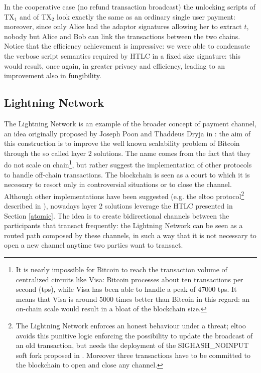 In the cooperative case (no refund transaction broadcast) the unlocking scripts of TX$_1$ and of TX$_2$ look exactly the same as an ordinary single user payment: moreover, since only Alice had the adaptor signatures allowing her to extract $t$, nobody but Alice and Bob can link the transactions between the two chains.
\\
Notice that the efficiency achievement is impressive: we were able to condensate the verbose script semantics required by HTLC in a fixed size signature: this would result, once again, in greater privacy and efficiency, leading to an improvement also in fungibility.

\bigskip

\subsection{Lightning Network}
\label{ln}
The Lightning Network is an example of the broader concept of payment channel, an idea originally proposed by Joseph Poon and Thaddeus Dryja in \cite{RefWork:18}: the aim of this construction is to improve the well known scalability problem of Bitcoin through the so called layer 2 solutions. The name comes from the fact that they do not scale on chain\footnote{It is nearly impossible for Bitcoin to reach the transaction volume of centralized circuits like Visa: Bitcoin processes about ten transactions per second (tps), while Visa has been able to handle a peak of 47000 tps. It means that Visa is around 5000 times better than Bitcoin in this regard: an on-chain scale would result in a bloat of the blockchain size.}, but rather suggest the implementation of other protocols to handle off-chain transactions. The blockchain is seen as a court to which it is necessary to resort only in controversial situations or to close the channel. Although other implementations have been suggested (e.g. the eltoo protocol\footnote{The Lightning Network enforces an honest behaviour under a threat; eltoo avoids this punitive logic enforcing the possibility to update the broadcast of an old transaction, but needs the deployment of the SIGHASH\_NOINPUT soft fork proposed in \cite{BIP5}. Moreover three transactions have to be committed to the blockchain to open and close any channel.} described in \cite{RefWork:19}), nowadays layer 2 solutions leverage the HTLC presented in Section \ref{atomic}. The idea is to create bidirectional channels between the participants that transact frequently: the Lightning Network can be seen as a routed path composed by these channels, in such a way that it is not necessary to open a new channel anytime two parties want to transact.
